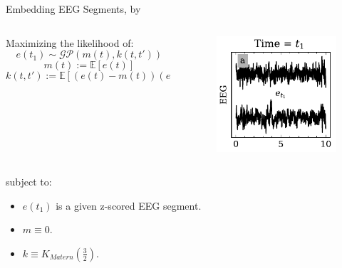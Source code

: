 \documentclass[t]{beamer}
\theoremstyle{definition}
\def\baselineskip{}%
\begin{document}
\begin{frame}{Embedding EEG Segments, by}

\begin{columns}[T] %
    
    \begin{column}{0.618\textwidth} %

    \begin{block}{Maximizing the likelihood of:}
        $$e(t_1) \sim \mathcal{GP}(m(t), k(t, t'))$$
        $$m(t) := \mathbb{E}[e(t)]$$
        $$k(t, t') := \mathbb{E}[(e(t) - m(t))(e(t') - m(t'))]$$
    \end{block}
    
    \end{column}
    
    \begin{column}{0.382\textwidth} %
    \vspace{-\baselineskip}
    \begin{figure}
        \centering
        \includegraphics[width=\textwidth]{figs/eeg_sample.pdf}
        \label{fig:my_label}
    \end{figure}
    
    \end{column}
\end{columns}
    \vspace{-\baselineskip}
    \begin{block}{subject to:}
        \begin{itemize}
            \item $e(t_1)$ is a given z-scored EEG segment.
            \item $m \equiv 0$.
            \item $k \equiv K_{Matern}(\frac{3}{2})$.
        \end{itemize}
    \end{block}


\end{frame}
\end{document}
